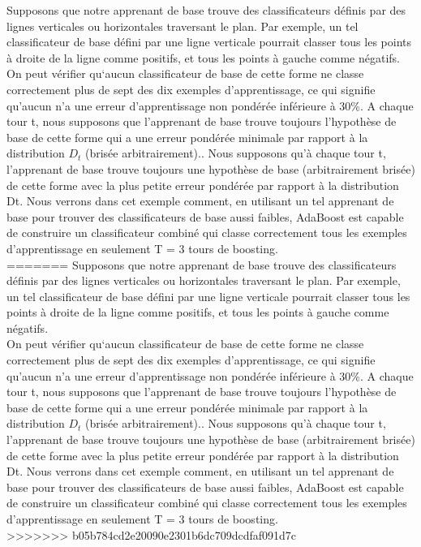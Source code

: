 \documentclass[french,a4paper,12pt]{article}
\begin{document}
 
 \quad Supposons que notre apprenant de base trouve des classificateurs définis par des lignes verticales ou horizontales traversant le plan. Par exemple, un tel classificateur de base défini par une ligne verticale pourrait classer tous les points à droite de la ligne comme positifs, et tous les points à gauche comme négatifs. On peut vérifier qu`aucun classificateur de base de cette forme ne classe correctement plus de sept des dix exemples d'apprentissage, ce qui signifie qu'aucun n'a une erreur d'apprentissage non pondérée inférieure à 30\%. A chaque tour t, nous supposons que l'apprenant de base trouve toujours l'hypothèse de base de cette forme qui a une erreur pondérée minimale par rapport à la distribution $D_t$ (brisée arbitrairement).. Nous supposons qu'à chaque tour t, l'apprenant de base trouve toujours une hypothèse de base (arbitrairement brisée) de cette forme avec la plus petite erreur pondérée par rapport à la distribution Dt. Nous verrons dans cet exemple comment, en utilisant un tel apprenant de base pour trouver des classificateurs de base aussi faibles, AdaBoost est capable de construire un classificateur combiné qui classe correctement tous les exemples d'apprentissage en seulement T = 3 tours de boosting. \\
=======
 \quad Supposons que notre apprenant de base trouve des classificateurs définis par des lignes verticales ou horizontales traversant le plan. Par exemple, un tel classificateur de base défini par une ligne verticale pourrait classer tous les points à droite de la ligne comme positifs, et tous les points à gauche comme négatifs. \\
On peut vérifier qu`aucun classificateur de base de cette forme ne classe correctement plus de sept des dix exemples d'apprentissage, ce qui signifie qu'aucun n'a une erreur d'apprentissage non pondérée inférieure à 30\%. A chaque tour t, nous supposons que l'apprenant de base trouve toujours l'hypothèse de base de cette forme qui a une erreur pondérée minimale par rapport à la distribution $D_t$ (brisée arbitrairement).. Nous supposons qu'à chaque tour t, l'apprenant de base trouve toujours une hypothèse de base (arbitrairement brisée) de cette forme avec la plus petite erreur pondérée par rapport à la distribution Dt. Nous verrons dans cet exemple comment, en utilisant un tel apprenant de base pour trouver des classificateurs de base aussi faibles, AdaBoost est capable de construire un classificateur combiné qui classe correctement tous les exemples d'apprentissage en seulement T = 3 tours de boosting. \\
>>>>>>> b05b784cd2e20090e2301b6dc709dcdfaf091d7c
\end{document}
